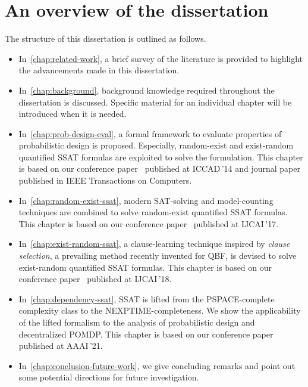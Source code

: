 \section{An overview of the dissertation}
The structure of this dissertation is outlined as follows.
\begin{itemize}
      \item
            In~\cref{chap:related-work}, a brief survey of the literature is provided to highlight the advancements made in this dissertation.
      \item
            In~\cref{chap:background}, background knowledge required throughout the dissertation is discussed.
            Specific material for an individual chapter will be introduced when it is needed.
      \item
            In~\cref{chap:prob-design-eval}, a formal framework to evaluate properties of probabilistic design is proposed.
            Especially, random-exist and exist-random quantified SSAT formulas are exploited to solve the formulation.
            This chapter is based on our conference paper~\cite{LeeICCAD14ProbDesign} published at ICCAD\,'14 and journal paper~\cite{LeeTC18ProbDesign} published in IEEE Transactions on Computers.
      \item
            In~\cref{chap:random-exist-ssat}, modern SAT-solving and model-counting techniques are combined to solve random-exist quantified SSAT formulas.
            This chapter is based on our conference paper~\cite{LeeIJCAI17RESSAT} published at IJCAI\,'17.
      \item
            In~\cref{chap:exist-random-ssat}, a clause-learning technique inspired by \textit{clause selection}, a prevailing method recently invented for QBF, is devised to solve exist-random quantified SSAT formulas.
            This chapter is based on our conference paper~\cite{LeeIJCAI18ERSSAT} published at IJCAI\,'18.
      \item
            In~\cref{chap:dependency-ssat}, SSAT is lifted from the PSPACE-complete complexity class to the NEXPTIME-completeness.
            We show the applicability of the lifted formalism to the analysis of probabilistic design and decentralized POMDP.
            This chapter is based on our conference paper~\cite{LeeAAAI21DSSAT} published at AAAI\,'21.
      \item
            In~\cref{chap:conclusion-future-work}, we give concluding remarks and point out some potential directions for future investigation.
\end{itemize}

